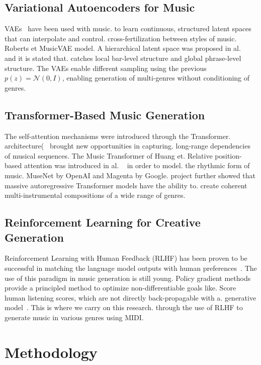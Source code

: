 \documentclass[conference]{IEEEtran}
\begin{document}
\subsection{Variational Autoencoders for Music}

VAEs~\cite{kingma2013auto} have been used with music.
to learn continuous, structured latent spaces that can interpolate and control.
cross-fertilization between styles of music. Roberts et MusicVAE model.
A hierarchical latent space was proposed in al. ~\cite{roberts2018hierarchical} and it is stated that.
catches local bar-level structure and global phrase-level structure.
The VAEs enable different sampling using the previous $p(z) = \mathcal{N}(0, I)$,
enabling generation of multi-genres without conditioning of genres.

\subsection{Transformer-Based Music Generation}

The self-attention mechanisms were introduced through the Transformer.
architecture(~\cite{vaswani2017attention} brought new opportunities in capturing.
long-range dependencies of musical sequences. The Music Transformer of Huang et.
Relative position-based attention was introduced in al. ~\cite{huang2018music} in order to model.
the rhythmic form of music. MuseNet by OpenAI and Magenta by Google.
project further showed that massive autoregressive Transformer models have the ability to.
create coherent multi-instrumental compositions of a wide range of genres.

\subsection{Reinforcement Learning for Creative Generation}

Reinforcement Learning with Human Feedback (RLHF) has been proven to be successful in
matching the language model outputs with human preferences~\cite{christiano2017deep}.
The use of this paradigm in music generation is still young. Policy gradient
methods provide a principled method to optimize non-differentiable goals like.
Score human listening scores, which are not directly back-propagable with a.
generative model~\cite{yi2018automatic}. This is where we carry on this research.
through the use of RLHF to generate music in various genres using MIDI.

\section{Methodology}
\label{sec:method}
\end{document}
